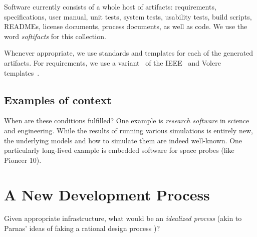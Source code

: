 \documentclass[sigconf,review,anonymous=false]{acmart}
\begin{document}
Software currently consists of a whole host of artifacts: requirements,
specifications, user manual, unit tests, system tests, usability tests,
build scripts, READMEs, license documents, process documents, as well as
code. We use the word \emph{softifacts} for this collection.

Whenever appropriate, we use standards and templates for each of the
generated artifacts. For requirements, we use a variant~\cite{SmithEtAl2007}
of the IEEE~\cite{IEEE1998}
and Volere templates~\cite{RobertsonAndRobertson1999Vol}.

\subsection{Examples of context}

When are these conditions fulfilled? One example is
\emph{research software} in science and engineering. While the results of
running various simulations is entirely new, the underlying models and
how to simulate them are indeed well-known. One particularly long-lived
example is embedded software for space probes (like Pioneer 10).

\section{A New Development Process}\label{ch:process}

Given appropriate infrastructure, what would be an \emph{idealized process}
(akin to Parnas' ideas of faking a rational design process \cite{Parnas1986})?
\end{document}
